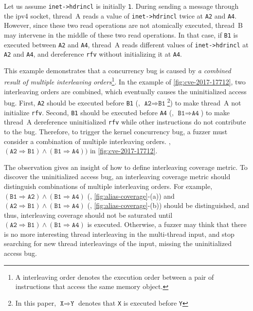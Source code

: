 Let us assume \texttt{inet->hdrincl} is initially \texttt{1}.
%
During sending a message through the ipv4 socket, thread~A reads a
value of \texttt{inet->hdrincl} twice at \texttt{A2} and \texttt{A4}.
%
However, since these two read operations are not atomically executed,
thread~B may intervene in the middle of these two read operations.
%
In that case, if \texttt{B1} is executed between \texttt{A2} and
\texttt{A4}, thread~A reads different values of \texttt{inet->hdrincl}
at \texttt{A2} and \texttt{A4}, and dereference \texttt{rfv} without
initializing it at \texttt{A4}.


%
This example demonstrates that a concurrency bug is caused by
\textit{a combined result of multiple interleaving orders}\footnote{A
  interleaving order denotes the execution order between a pair of
  instructions that access the same memory object.}.
%
In the example of \autoref{fig:cve-2017-17712}, two interleaving orders
are combined, which eventually causes the uninitialized access bug.
%
First, \texttt{A2} should be executed before \texttt{B1} (\ie,
$\texttt{A2} \Rightarrow \texttt{B1}$\footnote{In this paper,
  $\texttt{X} \Rightarrow \texttt{Y}$ denotes that \texttt{X} is
  executed before \texttt{Y}}) to make thread~A not initialize
\texttt{rfv}.
%
Second, \texttt{B1} should be executed before \texttt{A4} (\ie,
$\texttt{B1} \Rightarrow \texttt{A4}$) to make thread~A dereference
uninitialized \texttt{rfv} while other instructions do not contribute
to the bug.
%
Therefore, to trigger the kernel concurrency bug, a fuzzer must
consider a combination of multiple interleaving orders. \eg, 
$(\texttt{A2} \Rightarrow \texttt{B1}) \wedge (\texttt{B1} \Rightarrow
\texttt{A4}))$ in \autoref{fig:cve-2017-17712}.


 The observation
gives an insight of how to define interleaving coverage metric.  To
discover the uninitialized access bug, an interleaving coverage metric
should distinguish combinations of multiple interleaving orders.
%
For example,
$(\texttt{B1} \Rightarrow \texttt{A2}) \wedge (\texttt{B1} \Rightarrow
\texttt{A4})$ (\ie, \autoref{fig:alias-coverage}-(a)) and
$(\texttt{A2} \Rightarrow \texttt{B1}) \wedge (\texttt{B1} \Rightarrow
\texttt{A4})$ (\ie, \autoref{fig:alias-coverage}-(b)) should be
distinguished, and thus, interleaving coverage should not be saturated
until
$(\texttt{A2} \Rightarrow \texttt{B1}) \wedge (\texttt{B1} \Rightarrow
\texttt{A4})$ is executed.
%
Otherwise, a fuzzer may think that there is no more interesting thread
interleaving in the multi-thread input, and stop searching for new
thread interleavings of the input, missing the uninitialized access
bug.

